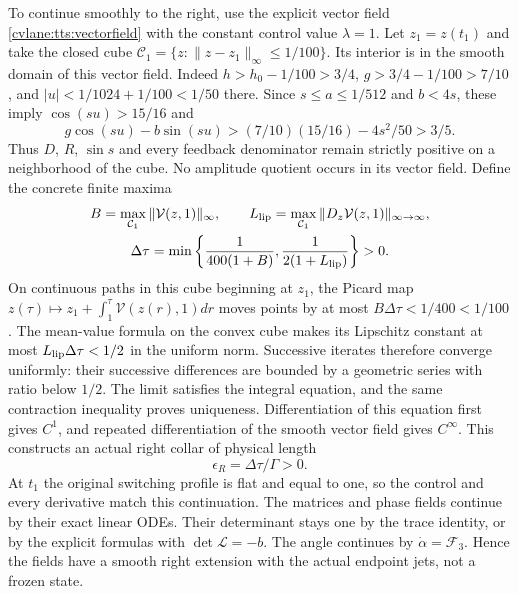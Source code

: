 To continue smoothly to the right, use the explicit vector field
\eqref{cvlane:tts:vectorfield} with the constant control value $\lambda=1$.
Let $z_1=z(t_1)$ and take the closed cube
$\mathcal C_1=\{z:\|z-z_1\|_\infty\leq1/100\}$.
Its interior is in the smooth domain of this vector field. Indeed
$h>h_0-1/100>3/4$, $g>3/4-1/100>7/10$, and
$|u|<1/1024+1/100<1/50$ there. Since $s\leq a\leq1/512$
and $b<4s$, these imply $\cos(su)>15/16$ and
\[
 g\cos(su)-b\sin(su)
    >(7/10)(15/16)-4s^2/50>3/5.
\]
Thus $D$, $R$, $\sin s$ and every feedback denominator remain
strictly positive on a neighborhood of the cube. No amplitude
quotient occurs in its vector field. Define the concrete finite maxima
\begin{equation}\label{cvlane:tts:collarconstants}
 \begin{gathered}
 B=\max_{\mathcal C_1}\|\mathcal V(z,1)\|_\infty,
 \qquad L_{\rm lip}=\max_{\mathcal C_1}
                            \|D_z\mathcal V(z,1)\|_{\infty\to\infty},\\
 \Delta\tau=\min\left\{\frac1{400(1+B)},
                            \frac1{2(1+L_{\rm lip})}\right\}>0.
 \end{gathered}
\end{equation}
On continuous paths in this cube beginning at $z_1$, the Picard
map $z(\tau)\mapsto z_1+\int_1^\tau\mathcal V(z(r),1)dr$
moves points by at most $B\Delta\tau<1/400<1/100$.
The mean-value formula on the convex cube makes its Lipschitz
constant at most $L_{\rm lip}\Delta\tau<1/2$ in the uniform
norm. Successive iterates therefore converge uniformly: their
successive differences are bounded by a geometric series with
ratio below $1/2$. The limit satisfies the integral equation,
and the same contraction inequality proves uniqueness. Differentiation
of this equation first gives $C^1$, and repeated differentiation of
the smooth vector field gives $C^\infty$. This constructs an actual
right collar of physical length
\begin{equation}\label{cvlane:tts:collarlength}
 \epsilon_R=\Delta\tau/\Gamma>0.
\end{equation}
At $t_1$ the original switching profile is flat and equal to one,
so the control and every derivative match this continuation.
The matrices and phase fields continue by their exact linear ODEs.
Their determinant stays one by the trace identity, or by the
explicit formulas with $\det\mathcal L=-b$. The angle continues
by $\dot\alpha=\mathcal F_3$. Hence the fields have a smooth
right extension with the actual endpoint jets, not a frozen state.

